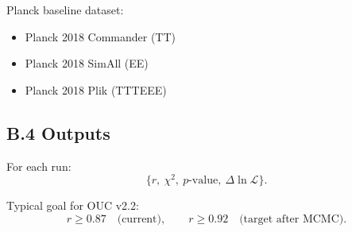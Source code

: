 Planck baseline dataset:
\begin{itemize}
\item Planck 2018 Commander (TT)  
\item Planck 2018 SimAll (EE)  
\item Planck 2018 Plik (TTTEEE)  
\end{itemize}

\subsection*{B.4 Outputs}

For each run:
\[
\{ r,\ \chi^2,\ p\text{-value},\ \Delta\ln \mathcal{L} \}.
\]

Typical goal for OUC v2.2:
\[
r \ge 0.87 \quad \text{(current)}, 
\qquad r \ge 0.92 \quad \text{(target after MCMC)}.
\]
